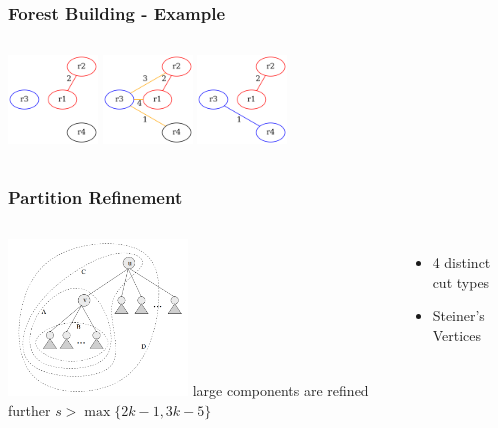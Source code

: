\begin{frame}
  \frametitle{Forest Building - Example}
  \begin{columns}
    \includegraphics[width=90px]{../graphs/cost-graph-s3.png}
    \includegraphics[width=90px]{../graphs/cost-graph-s4.png}
    \includegraphics[width=90px]{../graphs/cost-graph-s5.png}
  \end{columns}
\end{frame}

\begin{frame}
  \frametitle{Partition Refinement}
  \begin{columns}
    \includegraphics[width=180px]{../images/graph-cuts.png}
  large components are refined further
  \color{red}\(s > \max\{2k-1,3k-5\}\)
  \begin{itemize}
    \item 4 distinct cut types
    \item  Steiner's Vertices\cite{aggarwal}
  \end{itemize}
  \end{columns}
\end{frame}
